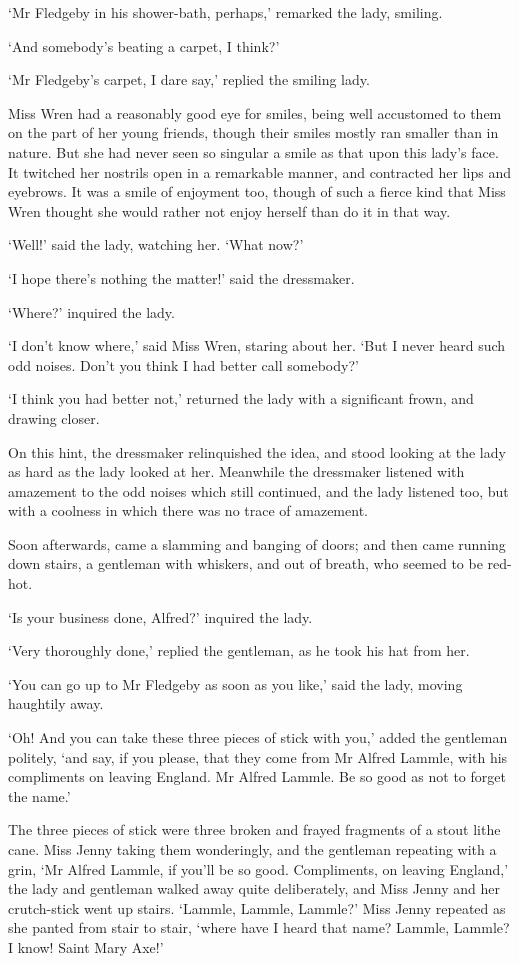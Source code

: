 ‘Mr Fledgeby in his shower-bath, perhaps,’ remarked the lady, smiling.

‘And somebody’s beating a carpet, I think?’

‘Mr Fledgeby’s carpet, I dare say,’ replied the smiling lady.

Miss Wren had a reasonably good eye for smiles, being well accustomed
to them on the part of her young friends, though their smiles mostly ran
smaller than in nature. But she had never seen so singular a smile
as that upon this lady’s face. It twitched her nostrils open in a
remarkable manner, and contracted her lips and eyebrows. It was a smile
of enjoyment too, though of such a fierce kind that Miss Wren thought
she would rather not enjoy herself than do it in that way.

‘Well!’ said the lady, watching her. ‘What now?’

‘I hope there’s nothing the matter!’ said the dressmaker.

‘Where?’ inquired the lady.

‘I don’t know where,’ said Miss Wren, staring about her. ‘But I never
heard such odd noises. Don’t you think I had better call somebody?’

‘I think you had better not,’ returned the lady with a significant
frown, and drawing closer.

On this hint, the dressmaker relinquished the idea, and stood looking
at the lady as hard as the lady looked at her. Meanwhile the dressmaker
listened with amazement to the odd noises which still continued, and the
lady listened too, but with a coolness in which there was no trace of
amazement.

Soon afterwards, came a slamming and banging of doors; and then came
running down stairs, a gentleman with whiskers, and out of breath, who
seemed to be red-hot.

‘Is your business done, Alfred?’ inquired the lady.

‘Very thoroughly done,’ replied the gentleman, as he took his hat from
her.

‘You can go up to Mr Fledgeby as soon as you like,’ said the lady,
moving haughtily away.

‘Oh! And you can take these three pieces of stick with you,’ added the
gentleman politely, ‘and say, if you please, that they come from Mr
Alfred Lammle, with his compliments on leaving England. Mr Alfred
Lammle. Be so good as not to forget the name.’

The three pieces of stick were three broken and frayed fragments of a
stout lithe cane. Miss Jenny taking them wonderingly, and the gentleman
repeating with a grin, ‘Mr Alfred Lammle, if you’ll be so good.
Compliments, on leaving England,’ the lady and gentleman walked away
quite deliberately, and Miss Jenny and her crutch-stick went up stairs.
‘Lammle, Lammle, Lammle?’ Miss Jenny repeated as she panted from stair
to stair, ‘where have I heard that name? Lammle, Lammle? I know! Saint
Mary Axe!’

